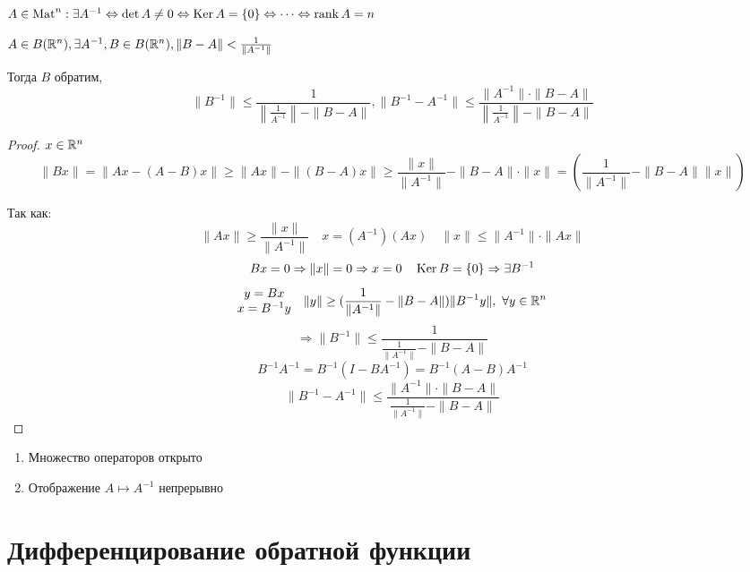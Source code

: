     $A \in \operatorname{Mat}^{n} : \exists A^{-1} \Leftrightarrow \det A \not= 0 \Leftrightarrow \operatorname{Ker} A = \{0\} \Leftrightarrow \dots \Leftrightarrow \operatorname{rank} A = n$

    \begin{theorem}
        $A \in B(\mathbb{R}^n), \exists A^{-1}, B \in B(\mathbb{R}^n), \| B - A \| < \frac{1}{\| A^{-1} \|}$
        \par Тогда $B$ обратим,
        \[
            \| B^{-1} \| \le \frac{1}{\left\| \frac{1}{A^{-1}} \right\| - \| B - A \|}, \| B^{-1} - A^{-1} \| \le \frac{\| A^{-1} \| \cdot \| B - A \|}{\left\|\frac{1}{A^{-1}}\right\| - \| B - A \|}  
        \]
    \end{theorem}

    \begin{proof}
        $x \in \mathbb{R}^n$
        \[
            \| Bx \| = \| Ax - (A-B)x \| \ge \| Ax \| - \| (B-A)x \| \ge \frac{\| x \|}{\| A^{-1} \|} - \| B-A \| \cdot \| x \| = (\frac{1}{\|A^{-1}\|} - \|B-A\|\|x\|)
        \]
        \par Так как:
        \[
            \|Ax\| \ge \frac{\|x\|}{\|A^{-1}\|} \quad x = (A^{-1})(Ax) \quad \|x\| \le \|A^{-1}\| \cdot \|Ax\|  
        \]
        \[
            Bx = 0 \Rightarrow \|x\| = 0 \Rightarrow x = 0 \quad \operatorname{Ker} B = \{0\} \Rightarrow \exists B^{-1}  
        \]
        \[
            \begin{matrix} y = Bx \\ x = B^{-1}y \end{matrix} \quad \|y\| \ge (\frac{1}{\|A^{-1}\|} - \|B-A\|)\|B^{-1}y\|, \ \forall y \in \mathbb{R}^n  
        \]
        \[
            \Rightarrow \|B^{-1}\| \le \frac{1}{\frac{1}{\|A^{-1}\|} - \|B-A\|}    
        \]
        \[
            B^{-1}A^{-1} = B^{-1}(I-BA^{-1}) = B^{-1}(A-B)A^{-1}
        \]
        \[
            \|B^{-1}-A^{-1}\| \le \frac{\|A^{-1}\| \cdot \|B-A\|}{\frac{1}{\|A^{-1}\|} - \|B-A\|}
        \]
    \end{proof}

    \begin{remark}\leavevmode
        \begin{enumerate}
            \item Множество операторов открыто
            \item Отображение $A \mapsto A^{-1}$ непрерывно
        \end{enumerate}
    \end{remark}
    
    \section*{Дифференцирование обратной функции}

